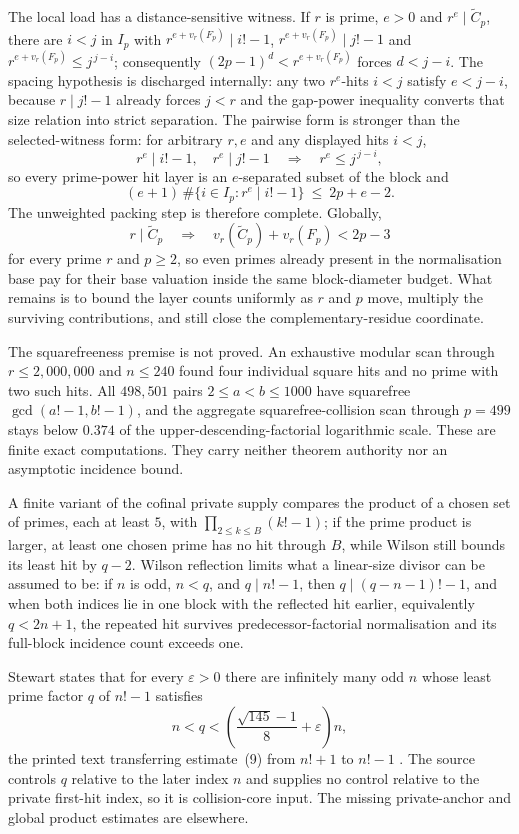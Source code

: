 \documentclass[11pt]{article}
\begin{document}
The local load has a distance-sensitive witness.  If $r$ is prime, $e>0$ and
$r^e\mid\widetilde C_p$, there are $i<j$ in $I_p$ with
$r^{e+v_r(F_p)}\mid i!-1$, $r^{e+v_r(F_p)}\mid j!-1$ and
$r^{e+v_r(F_p)}\le j^{\,j-i}$; consequently $(2p-1)^d<r^{e+v_r(F_p)}$ forces
$d<j-i$.  The spacing hypothesis is discharged internally: any two $r^e$-hits
$i<j$ satisfy $e<j-i$, because $r\mid j!-1$ already forces $j<r$ and the
gap-power inequality converts that size relation into strict separation.  The
pairwise form is stronger than the selected-witness form: for arbitrary $r,e$
and any displayed hits $i<j$,
\[
 r^e\mid i!-1,\quad r^e\mid j!-1
 \quad\Longrightarrow\quad r^e\le j^{\,j-i},
\]
so every prime-power hit layer is an $e$-separated subset of the block and
\[
 (e+1)\,\#\{i\in I_p:r^e\mid i!-1\}\ \le\ 2p+e-2 .
\]
The unweighted packing step is therefore complete.  Globally,
\[
 r\mid\widetilde C_p
 \quad\Longrightarrow\quad
 v_r(\widetilde C_p)+v_r(F_p)<2p-3
\]
for every prime $r$ and $p\ge2$, so even primes already present in the
normalisation base pay for their base valuation inside the same
block-diameter budget.  What remains is to bound the layer counts uniformly
as $r$ and $p$ move, multiply the surviving contributions, and still close
the complementary-residue coordinate.

The squarefreeness premise is not proved.  An exhaustive modular scan through
$r\le2{,}000{,}000$ and $n\le240$ found four individual square hits and no
prime with two such hits.  All $498{,}501$ pairs $2\le a<b\le1000$ have
squarefree $\gcd(a!-1,b!-1)$, and the aggregate squarefree-collision scan
through $p=499$ stays below $0.374$ of the upper-descending-factorial
logarithmic scale.  These are finite exact computations.  They carry neither theorem authority
nor an asymptotic incidence bound.

A finite variant of the cofinal private supply compares the product of a
chosen set of primes, each at least $5$, with $\prod_{2\le k\le B}(k!-1)$; if
the prime product is larger, at least one chosen prime has no hit through
$B$, while Wilson still bounds its least hit by $q-2$.  Wilson reflection
limits what a linear-size divisor can be assumed to be: if $n$ is odd,
$n<q$, and $q\mid n!-1$, then $q\mid(q-n-1)!-1$, and when both indices lie in
one block with the reflected hit earlier, equivalently $q<2n+1$, the repeated
hit survives predecessor-factorial normalisation and its full-block incidence
count exceeds one.

Stewart states that for every $\varepsilon>0$ there are infinitely many odd
$n$ whose least prime factor $q$ of $n!-1$ satisfies
\[
 n<q<\left(\frac{\sqrt{145}-1}{8}+\varepsilon\right)n ,
\]
the printed text transferring estimate~(9) from $n!+1$ to $n!-1$
\cite[p.~464]{stewart2004}.  The source controls $q$ relative to the later
index $n$ and supplies no control relative to the private first-hit index,
so it is collision-core input.  The missing private-anchor and global product
estimates are elsewhere.
\end{document}
